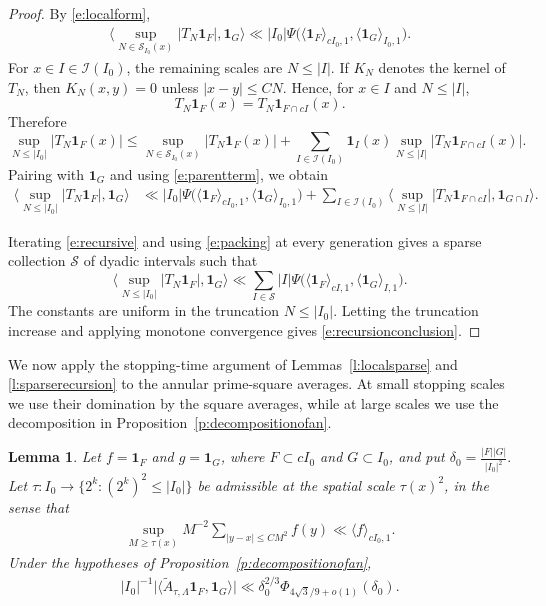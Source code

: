 \documentclass[12pt,reqno]{amsart}
\numberwithin{equation}{section}
\newtheorem{lemma}[equation]{Lemma}
\theoremstyle{definition}
\theoremstyle{remark}
\begin{document}
\begin{proof}
By \eqref{e:localform},
\begin{align}\label{e:parentterm}
 \big\langle
 \sup_{N\in\mathcal S_{I_0}(x)}|T_N\mathbf1_F|,
 \mathbf1_G
 \big\rangle
 \ll
 |I_0|\Psi\bigl(\langle\mathbf1_F\rangle_{cI_0,1},\langle\mathbf1_G\rangle_{I_0,1}\bigr).
\end{align}
For \(x\in I\in\mathcal I(I_0)\), the remaining scales are
\(N\leq |I|\).  If \(K_N\) denotes the kernel of \(T_N\), then
\(K_N(x,y)=0\) unless \(|x-y|\leq CN\).  Hence, for \(x\in I\) and
\(N\leq |I|\),
\[
 T_N\mathbf1_F(x)=T_N\mathbf1_{F\cap cI}(x).
\]
Therefore
\[
 \sup_{N\leq |I_0|}|T_N\mathbf1_F(x)|
 \leq
 \sup_{N\in\mathcal S_{I_0}(x)}|T_N\mathbf1_F(x)|
 +
 \sum_{I\in\mathcal I(I_0)}
 \mathbf1_I(x)
 \sup_{N\leq |I|}|T_N\mathbf1_{F\cap cI}(x)|.
\]
Pairing with \(\mathbf1_G\) and using \eqref{e:parentterm}, we obtain
\begin{align}\label{e:recursive}
 \big\langle\sup_{N\leq|I_0|}|T_N\mathbf1_F|,\mathbf1_G\big\rangle
 &\ll |I_0|\Psi\bigl(\langle\mathbf1_F\rangle_{cI_0,1},
                  \langle\mathbf1_G\rangle_{I_0,1}\bigr) +
 \sum_{I\in\mathcal I(I_0)}
 \big\langle\sup_{N\leq|I|}
 |T_N\mathbf1_{F\cap cI}|,\mathbf1_{G\cap I}\big\rangle .
\end{align}

Iterating \eqref{e:recursive} and using \eqref{e:packing} at every
generation gives a sparse collection \(\mathcal S\) of dyadic intervals
such that
\[
 \big\langle\sup_{N\leq|I_0|}|T_N\mathbf1_F|,\mathbf1_G\big\rangle
 \ll
 \sum_{I\in\mathcal S}
 |I|\Psi\bigl(\langle\mathbf1_F\rangle_{cI,1},\langle\mathbf1_G\rangle_{I,1}\bigr).
\]
The constants are uniform in the truncation \(N\leq |I_0|\).  Letting
the truncation increase and applying monotone convergence gives
\eqref{e:recursionconclusion}.
\end{proof}

We now apply the stopping-time argument of
Lemmas~\ref{l:localsparse} and \ref{l:sparserecursion} to the annular
prime-square averages.  At small stopping scales we use their domination
by the square averages, while at large scales we use the decomposition in
Proposition~\ref{p:decompositionofan}.

\begin{lemma}\label{l:primeendpointlocal}
Let $f=\mathbf1_F$ and $g=\mathbf1_G$, where
$F\subset cI_0$ and $G\subset I_0$, and put $\delta_0=\frac{|F||G|}{|I_0|^2}.$
 Let $\tau:I_0\to\{2^k:(2^k)^2\leq|I_0|\}$ be admissible at the
spatial scale $\tau(x)^2$, in the sense that
\begin{align}\label{e:admissprime}
 \sup_{M\geq\tau(x)}M^{-2}
 \sum_{|y-x|\leq CM^2}f(y)
 \ll\langle f\rangle_{cI_0,1}.
\end{align}
Under the hypotheses of Proposition~\ref{p:decompositionofan},
\begin{align}\label{e:primeendpointlocal}
 |I_0|^{-1}
 \big|\langle\widetilde A_{\tau,\Lambda}\mathbf1_F,
 \mathbf1_G\rangle\big|
 \ll\delta_0^{2/3}
 \Phi_{4\sqrt3/9+o(1)}(\delta_0).
\end{align}
\end{lemma}
\end{document}

